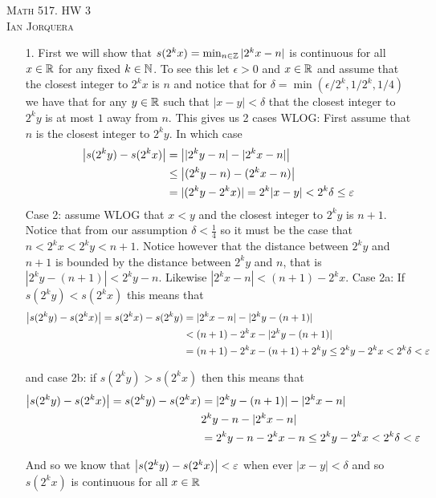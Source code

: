 \documentclass[12pt]{amsart}
\begin{document}
\begin{center}
    \textsc{Math 517. HW 3\\ Ian Jorquera}
\end{center}
\vspace{1em}

\begin{itemize}
    \item[1.] 
     First we will show that $s(2^kx)=\min_{n\in\mathbb{Z}}|2^kx-n|$ is continuous for all $x\in \mathbb{R}$ for any fixed $k\in\mathbb{N}$. 
     To see this let $\epsilon>0$ and $x\in \mathbb{R}$ and assume that the closest integer to $2^kx$ is $n$ and 
     notice that for $\delta=\min(\epsilon/2^{k},1/2^{k},1/4)$ we have that for any $y\in\mathbb{R}$ 
     such that $|x-y|<\delta$ that the closest integer to $2^ky$ is at most $1$ away from $n$.
     This gives us 2 cases WLOG: First assume that $n$ is the closest integer to $2^ky$. In which case 
     \begin{align*}
        \left\vert s(2^ky)-s(2^kx) \right\vert&=\left\vert |2^ky-n|-|2^kx-n| \right\vert\\
        &\leq \left\vert (2^ky-n)-(2^kx-n) \right\vert\\
            &=|(2^ky-2^kx)|=2^k|x-y|<2^k\delta\leq\varepsilon
     \end{align*}
     Case 2: assume WLOG that $x<y$ and the closest integer to $2^ky$ is $n+1$. 
     Notice that from our assumption $\delta<\frac{1}{4}$ so it must be the case that $n<2^kx<2^ky<n+1$.
     Notice however that the distance between $2^ky$ and $n+1$ is bounded by the distance between $2^ky$ and $n$, that is $|2^ky-(n+1)|< 2^ky-n$. 
     Likewise $|2^kx-n|< (n+1)-2^kx$. 
     Case 2a: If $s(2^ky)<s(2^kx)$ this means that
     \begin{align*}
        \left\vert s(2^ky)-s(2^kx) \right\vert=s(2^kx)-s(2^ky)&=|2^kx-n|-|2^ky-(n+1)|\\
        &<(n+1)-2^kx-|2^ky-(n+1)|\\
        &=(n+1)-2^kx-(n+1)+2^ky\leq 2^ky-2^kx<2^k\delta<\varepsilon
     \end{align*}

     and case 2b: if $s(2^ky)>s(2^kx)$ then this means that
     \begin{align*}
        \left\vert s(2^ky)-s(2^kx) \right\vert=s(2^ky)-s(2^kx)&=|2^ky-(n+1)|-|2^kx-n|\\
        &2^ky-n-|2^kx-n|\\
        &=2^ky-n-2^kx-n\leq 2^ky-2^kx<2^k\delta<\varepsilon
     \end{align*}
     
     And so we know that $\left\vert s(2^ky)-s(2^kx) \right\vert<\varepsilon$ when ever $|x-y|<\delta$ and so $s(2^kx)$ is continuous for all $x\in \mathbb{R}$\\


\end{itemize}
\end{document}
